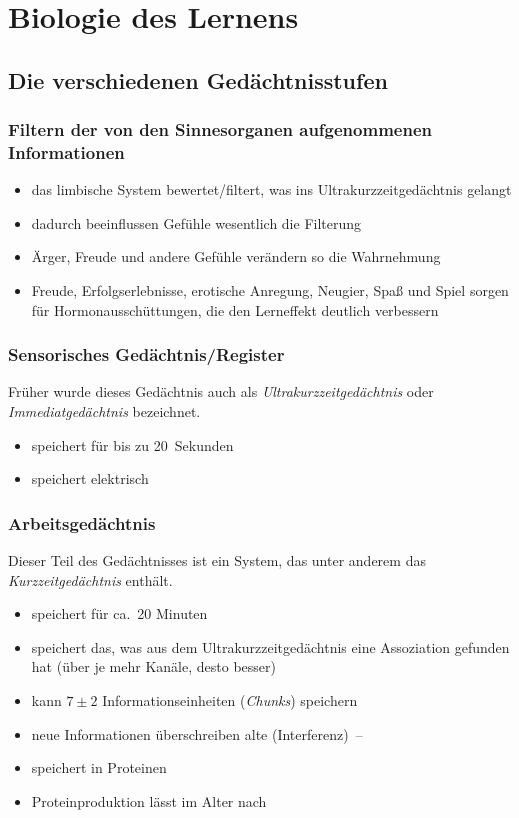 \section{Biologie des Lernens}
\label{lernbiologie}

\subsection{Die verschiedenen Gedächtnisstufen}

\subsubsection{Filtern der von den Sinnesorganen aufgenommenen Informationen}
\begin{itemize}
    \item das limbische System bewertet/filtert, was ins Ultrakurzzeitgedächtnis gelangt
    \item dadurch beeinflussen Gefühle wesentlich die Filterung
    \item Ärger, Freude und andere Gefühle verändern so die Wahrnehmung
    \item Freude, Erfolgserlebnisse, erotische Anregung, Neugier, Spaß und Spiel sorgen für Hormonausschüttungen, die den Lerneffekt deutlich verbessern
\end{itemize}

\subsubsection{Sensorisches Gedächtnis/Register}
Früher wurde dieses Gedächtnis auch als \emph{Ultrakurzzeitgedächtnis} oder \emph{Immediatgedächtnis} bezeichnet.

\begin{itemize}
    \item speichert für bis zu 20~Sekunden
    \item speichert elektrisch
\end{itemize}

\subsubsection{Arbeitsgedächtnis}
Dieser Teil des Gedächtnisses ist ein System, das unter anderem das \emph{Kurzzeitgedächtnis} enthält.
\begin{itemize}
    \item speichert für ca.~20 Minuten
    \item speichert das, was aus dem Ultrakurzzeitgedächtnis eine Assoziation gefunden hat (über je mehr Kanäle, desto besser)
    \item kann $7\pm 2$ Informationseinheiten (\emph{Chunks}) speichern
    \item neue Informationen überschreiben alte (Interferenz)~-- 
    \item speichert in Proteinen
    \item Proteinproduktion lässt im Alter nach
\end{itemize}

